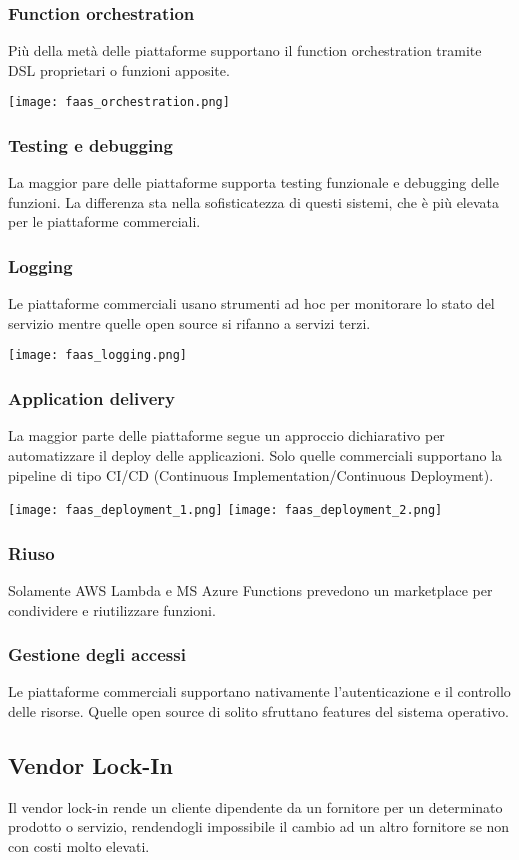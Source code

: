 \subsubsection{Function orchestration}
Più della metà delle piattaforme supportano il function orchestration tramite DSL proprietari o funzioni apposite.
\begin{center}
	\texttt{[image: faas\_orchestration.png]}
\end{center}

\subsubsection{Testing e debugging}
La maggior pare delle piattaforme supporta testing funzionale e debugging delle funzioni. La differenza sta nella sofisticatezza di questi sistemi, che è più elevata per le piattaforme commerciali.
\subsubsection{Logging}
Le piattaforme commerciali usano strumenti ad hoc per monitorare lo stato del servizio mentre quelle open source si rifanno a servizi terzi.
\begin{center}
	\texttt{[image: faas\_logging.png]}
\end{center}
\subsubsection{Application delivery}
La maggior parte delle piattaforme segue un approccio dichiarativo per automatizzare il deploy delle applicazioni. Solo quelle commerciali supportano la pipeline di tipo CI/CD (Continuous Implementation/Continuous Deployment).
\begin{center}
	\texttt{[image: faas\_deployment\_1.png]}
	\texttt{[image: faas\_deployment\_2.png]}
\end{center}
\subsubsection{Riuso}
Solamente AWS Lambda e MS Azure Functions prevedono un marketplace per condividere e riutilizzare funzioni.
\subsubsection{Gestione degli accessi}
Le piattaforme commerciali supportano nativamente l'autenticazione e il controllo delle risorse. Quelle open source di solito sfruttano features del sistema operativo.
\subsection{Vendor Lock-In}
\begin{definition}
	Il vendor lock-in rende un cliente dipendente da un fornitore per un determinato prodotto o servizio, rendendogli impossibile il cambio ad un altro fornitore se non con costi molto elevati.
\end{definition}